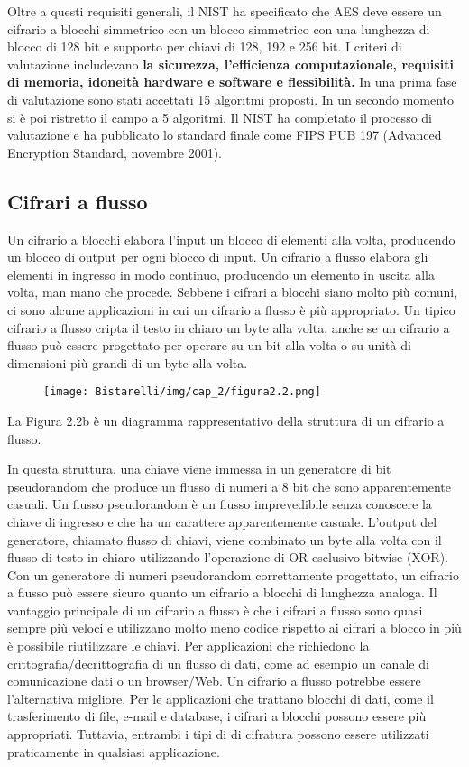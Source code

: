 \singlespacing

Oltre a questi requisiti generali, il NIST ha specificato che AES deve essere un cifrario a blocchi simmetrico con un blocco simmetrico con una lunghezza di blocco di 128 bit e supporto per chiavi di 128, 192 e 256 bit. 
I criteri di valutazione includevano \textbf{la sicurezza, l'efficienza computazionale, requisiti di memoria, idoneità hardware e software e flessibilità.} In una prima fase di valutazione sono stati accettati 15 algoritmi proposti. In un secondo momento si è poi ristretto il campo a 5 algoritmi. Il NIST ha completato il processo di valutazione e ha pubblicato lo standard finale come FIPS PUB 197 (Advanced Encryption Standard, novembre 2001). 

\subsection{Cifrari a flusso}
Un cifrario a blocchi elabora l'input un blocco di elementi alla volta, producendo un blocco di output per ogni blocco di input. Un cifrario a flusso elabora gli elementi in ingresso in modo continuo, producendo un elemento in uscita alla volta, man mano che procede. Sebbene i cifrari a blocchi siano molto più comuni, ci sono alcune applicazioni in cui un cifrario a flusso è più appropriato. Un tipico cifrario a flusso cripta il testo in chiaro un byte alla volta, anche se un cifrario a flusso può essere progettato per operare su un bit alla volta o su unità di dimensioni pi\`{u} grandi di un byte alla volta.

\begin{figure}[H]
	\centering
    \texttt{[image: Bistarelli/img/cap\_2/figura2.2.png]}
\end{figure}

La Figura 2.2b è un diagramma rappresentativo della struttura di un cifrario a flusso. 

\singlespacing

In questa struttura, una chiave viene immessa in un generatore di bit pseudorandom che produce un flusso di numeri a 8 bit che sono apparentemente casuali. Un flusso pseudorandom è un flusso imprevedibile senza conoscere la chiave di ingresso e che ha un carattere apparentemente casuale. L'output del generatore, chiamato flusso di chiavi, viene combinato un byte alla volta con il flusso di testo in chiaro utilizzando l'operazione di OR esclusivo bitwise (XOR). Con un generatore di numeri pseudorandom correttamente progettato, un cifrario a flusso può essere sicuro quanto un cifrario a blocchi di lunghezza analoga. Il vantaggio principale di un cifrario a flusso è che i cifrari a flusso sono quasi sempre più veloci e utilizzano molto meno codice rispetto ai cifrari a blocco in più è possibile riutilizzare le chiavi. Per applicazioni che richiedono la crittografia/decrittografia di un flusso di dati, come ad esempio un canale di comunicazione dati o un browser/Web. Un cifrario a flusso potrebbe essere l'alternativa migliore. Per le applicazioni che trattano blocchi di dati, come il trasferimento di file, e-mail e database, i cifrari a blocchi possono essere più appropriati. Tuttavia, entrambi i tipi di di cifratura possono essere utilizzati praticamente in qualsiasi applicazione.

